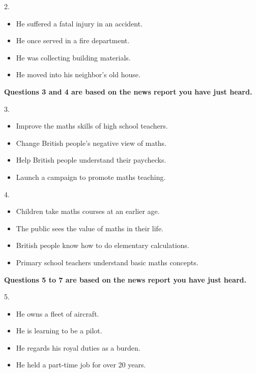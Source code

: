 \documentclass[UTF8,11pt]{ctexart}
\begin{document}
2.


\begin{itemize}[leftmargin=2em,itemsep=.2em,topsep=.4em]\item[A.] He suffered a fatal injury in an accident.
\item[B.] He once served in a fire department.
\item[C.] He was collecting building materials.
\item[D.] He moved into his neighbor’s old house.
\end{itemize}

\textbf{Questions 3 and 4 are based on the news report you have just heard.}


3.


\begin{itemize}[leftmargin=2em,itemsep=.2em,topsep=.4em]\item[A.] Improve the maths skills of high school teachers.
\item[B.] Change British people’s negative view of maths.
\item[C.] Help British people understand their paychecks.
\item[D.] Launch a campaign to promote maths teaching.
\end{itemize}

4.


\begin{itemize}[leftmargin=2em,itemsep=.2em,topsep=.4em]\item[A.] Children take maths courses at an earlier age.
\item[B.] The public sees the value of maths in their life.
\item[C.] British people know how to do elementary calculations.
\item[D.] Primary school teachers understand basic maths concepts.
\end{itemize}

\textbf{Questions 5 to 7 are based on the news report you have just heard.}


5.


\begin{itemize}[leftmargin=2em,itemsep=.2em,topsep=.4em]\item[A.] He owns a fleet of aircraft.
\item[B.] He is learning to be a pilot.
\item[C.] He regards his royal duties as a burden.
\item[D.] He held a part-time job for over 20 years.
\end{itemize}
\end{document}
